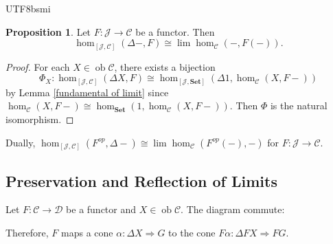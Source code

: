 \documentclass[12pt]{article}
\theoremstyle{definition}
\newtheorem{property}[definition]{Proposition}
\newcommand\<{\langle}
\renewcommand\>{\rangle}
\DeclareMathOperator{\ob}{ob}
\begin{document}
\begin{CJK}{UTF8}{bsmi}
\begin{property}
\label{limit}
    Let $F:\mathcal{J}\to\mathcal{C}$ be a functor.
    Then 
    \[
        \hom_{[\mathcal{J}, \mathcal{C}]}(\Delta-, F) \cong \lim\hom_\mathcal{C}(-, F(-)).
    \]
\end{property}
\begin{proof}
    For each $X\in\ob\mathcal{C}$, there exists a bijection
    \[
        \Phi_X:
        \hom_{[\mathcal{J}, \mathcal{C}]}(\Delta X, F) \cong
        \hom_{[\mathcal{J}, \textbf{Set}]}(\Delta 1, \hom_\mathcal{C}(X, F-))
    \]
    by Lemma \ref{fundamental of limit} since $\hom_\mathcal{C}(X, F-)\cong\hom_\textbf{Set}(1, \hom_\mathcal{C}(X, F-))$.
    Then $\Phi$ is the natural isomorphism.
\end{proof}

Dually, $\hom_{[\mathcal{J}, \mathcal{C}]}(F^{op}, \Delta-) \cong \lim\hom_\mathcal{C}(F^{op}(-), -)$ for $F:\mathcal{J}\to\mathcal{C}$.


\subsection{Preservation and Reflection of Limits}

Let $F:\mathcal{C}\to\mathcal{D}$ be a functor and $X\in\ob\mathcal{C}$.
The diagram commute:
\begin{center}
\end{center}
Therefore, $F$ maps a cone $\alpha:\Delta X\Rightarrow G$ to the cone $F\alpha:\Delta FX\Rightarrow FG$.


\end{CJK}
\end{document}
